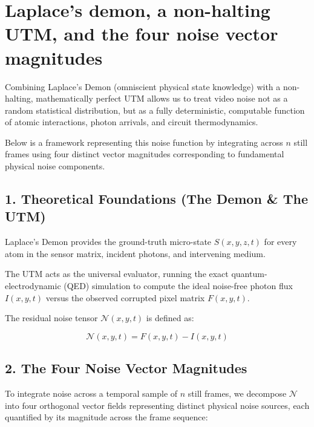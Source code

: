 \chapter{\texorpdfstring{Laplace's demon, a non-halting UTM, and the four noise vector magnitudes}{Laplace's demon, a non-halting UTM, and the four noise vector magnitudes}}
\label{chap:demon-utm-four-noise-vectors}

Combining Laplace's Demon (omniscient physical state knowledge) with a non-halting, mathematically perfect UTM allows us to treat video noise not as a random statistical distribution, but as a fully deterministic, computable function of atomic interactions, photon arrivals, and circuit thermodynamics.

Below is a framework representing this noise function by integrating across \(n\) still frames using four distinct vector magnitudes corresponding to fundamental physical noise components.

\section{\texorpdfstring{1. Theoretical Foundations (The Demon \& The UTM)}{1. Theoretical Foundations (The Demon \& The UTM)}}

Laplace's Demon provides the ground-truth micro-state \(S(x,y,z,t)\) for every atom in the sensor matrix, incident photons, and intervening medium.

The UTM acts as the universal evaluator, running the exact quantum-electrodynamic (QED) simulation to compute the ideal noise-free photon flux \(I(x, y, t)\) versus the observed corrupted pixel matrix \(F(x, y, t)\).

The residual noise tensor \(\mathcal{N}(x, y, t)\) is defined as:

\[
\mathcal{N}(x, y, t) = F(x, y, t) - I(x, y, t)
\]

\section{\texorpdfstring{2. The Four Noise Vector Magnitudes}{2. The Four Noise Vector Magnitudes}}

To integrate noise across a temporal sample of \(n\) still frames, we decompose \(\mathcal{N}\) into four orthogonal vector fields representing distinct physical noise sources, each quantified by its magnitude across the frame sequence:

